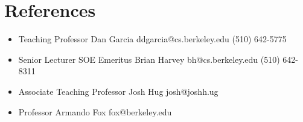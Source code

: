 \section{References}

\vspace{6pt}
 
\begin{itemize}
    \setlength\itemsep{1em}
    \item{
        Teaching Professor Dan Garcia
        \newline
        ddgarcia@cs.berkeley.edu
        \newline
        (510) 642-5775
    }
    
    \item{
        Senior Lecturer SOE Emeritus Brian Harvey
        \newline
        bh@cs.berkeley.edu
        \newline
        (510) 642-8311
    }
    
    \item{
        Associate Teaching Professor Josh Hug
        \newline
        josh@joshh.ug
    }
    
    \item{
        Professor Armando Fox
        \newline
        fox@berkeley.edu
    }
\end{itemize}
